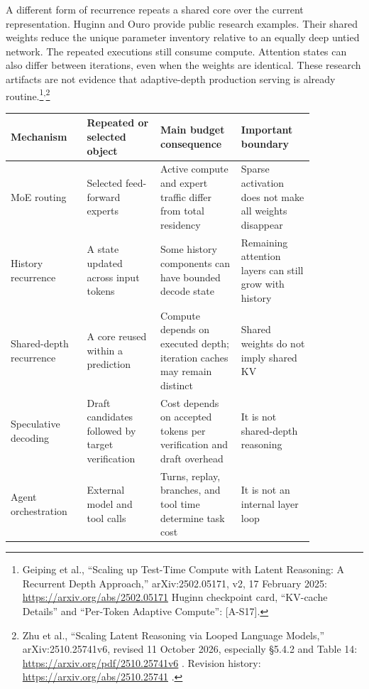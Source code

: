 A different form of recurrence repeats a shared core over the current
representation. Huginn and Ouro provide public research examples. Their
shared weights reduce the unique parameter inventory relative to an
equally deep untied network. The repeated executions still consume
compute. Attention states can also differ between iterations, even when
the weights are identical. These research artifacts are not evidence
that adaptive-depth production serving is already
routine.\footnote{Geiping et al., ``Scaling up Test-Time Compute with
  Latent Reasoning: A Recurrent Depth Approach,'' arXiv:2502.05171, v2,
  17 February 2025: \url{https://arxiv.org/abs/2502.05171} Huginn checkpoint
  card, ``KV-cache Details'' and ``Per-Token Adaptive Compute'':
  \mbox{{[}A-S17{]}}.}\textsuperscript{,}\footnote{Zhu et al., ``Scaling Latent
  Reasoning via Looped Language Models,'' arXiv:2510.25741v6, revised 11
  October 2026, especially §5.4.2 and Table 14:
  \url{https://arxiv.org/pdf/2510.25741v6} . Revision history:
  \url{https://arxiv.org/abs/2510.25741} .}

\nopagebreak[4]
\begin{longtable}[]{@{}
  >{\raggedright\arraybackslash}p{0.2127\linewidth}
  >{\raggedright\arraybackslash}p{0.2127\linewidth}
  >{\raggedright\arraybackslash}p{0.2127\linewidth}
  >{\raggedright\arraybackslash}p{0.2127\linewidth}@{}}
\toprule\noalign{}
\begin{minipage}[b]{\linewidth}\raggedright
Mechanism
\end{minipage} & \begin{minipage}[b]{\linewidth}\raggedright
Repeated or selected object
\end{minipage} & \begin{minipage}[b]{\linewidth}\raggedright
Main budget consequence
\end{minipage} & \begin{minipage}[b]{\linewidth}\raggedright
Important boundary
\end{minipage} \\
\midrule\noalign{}
\endhead
\bottomrule\noalign{}
\endlastfoot
MoE routing & Selected feed-forward experts & Active compute and expert
traffic differ from total residency & Sparse activation does not make
all weights disappear \\
\noalign{\label{tab:27.3}}
History recurrence & A state updated across input tokens & Some history
components can have bounded decode state & Remaining attention layers
can still grow with history \\
Shared-depth recurrence & A core reused within a prediction & Compute
depends on executed depth; iteration caches may remain distinct & Shared
weights do not imply shared KV \\
Speculative decoding & Draft candidates followed by target verification
& Cost depends on accepted tokens per verification and draft overhead &
It is not shared-depth reasoning \\
Agent orchestration & External model and tool calls & Turns, replay,
branches, and tool time determine task cost & It is not an internal
layer loop \\
\end{longtable}

